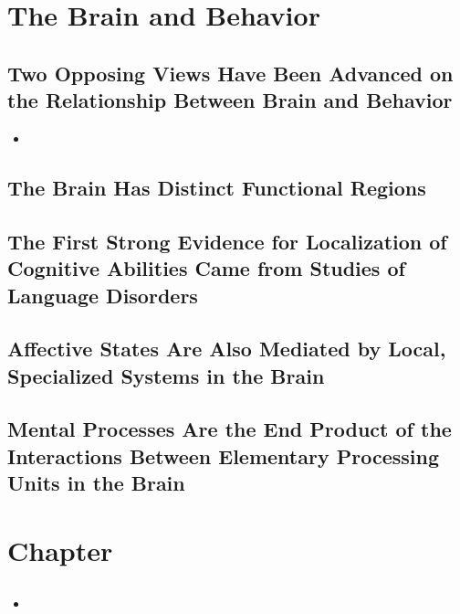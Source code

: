 \documentclass[12pt,a4paper]{article}
\begin{document}
\tableofcontents
\cleardoublepage
\fancyhead{}

\clearpage
\section{The Brain and Behavior}
\subsection*{Two Opposing Views Have Been Advanced on the Relationship Between Brain and Behavior}
\begin{itemize}
    \item
\end{itemize}

\subsection{The Brain Has Distinct Functional Regions}

\subsection{The First Strong Evidence for Localization of Cognitive Abilities Came from Studies of Language Disorders}

\subsection{Affective States Are Also Mediated by Local, Specialized Systems in the Brain}

\subsection{Mental Processes Are the End Product of the Interactions Between Elementary Processing Units in the Brain}

\clearpage
\section{Chapter}
\subsection{}
\begin{itemize}
    \item
\end{itemize}
\end{document}
